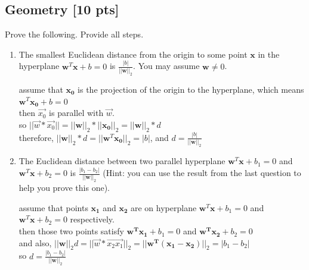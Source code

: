 \documentclass[a4paper]{article}
\theoremstyle{definition}
\newenvironment{soln}{
	\leavevmode\color{blue}\ignorespaces
}{}
\begin{document}
	
	
	\subsection{Geometry [10 pts]}
	Prove the following.  Provide all steps.
	\begin{enumerate}
		\item 	The smallest Euclidean distance from the origin to some point $\mathbf{x}$ in the hyperplane $\mathbf{w}^{T}\mathbf{x} + b = 0$ is $\frac{|b|}{||\mathbf{w}||_2}$.  You may assume $\mathbf{w} \neq 0$.\\
		\begin{soln} 
			assume that $\mathbf{x_{0}}$ is the projection of the origin to the hyperplane, which means $\mathbf{w}^{T}\mathbf{x_{0}} + b = 0$ \\
			then $\vec{x_{0}}$ is parallel with $\vec{w}$. \\
			so $||\vec{w}*\vec{x_{0}}|| = ||\mathbf{w}||_{2}*||\mathbf{x_{0}}||_{2} = ||\mathbf{w}||_{2}*d$ \\
			therefore, $||\mathbf{w}||_{2}*d = ||\mathbf{w}^{T}\mathbf{x_{0}}||_{2} = |b|$, and $d = \frac{|b|}{||\mathbf{w}||_2}$
		\end{soln}
		
		\item 	The Euclidean distance between two parallel hyperplane $\mathbf{w}^{T}\mathbf{x} + b_1 = 0$ and $\mathbf{w}^{T}\mathbf{x} + b_2 = 0$ is $\frac{|b_1 - b_2|}{||\mathbf{w}||_2}$ (Hint: you can use the result from the last question to help you prove this one).
		
		\begin{soln}
			assume that points $\mathbf{x_{1}}$ and $\mathbf{x_{2}}$ are on hyperplane $\mathbf{w}^{T}\mathbf{x} + b_1 = 0$ and $\mathbf{w}^{T}\mathbf{x} + b_2 = 0$ respectively. \\
			then those two points satisfy $\mathbf{w^{T}}\mathbf{x_{1}} + b_1 = 0$ and $\mathbf{w^{T}}\mathbf{x_{2}} + b_2 = 0$ \\
			and also, $||\mathbf{w}||_2d = ||\vec{w}*\vec{x_2x_1}||_2 = ||\mathbf{w^{T}}(\mathbf{x_1}-\mathbf{x_2})||_2 = |b_1 - b_2|$ \\
			so $d = \frac{|b_1 - b_2|}{||\mathbf{w}||_2}$ 
		\end{soln}
		
	\end{enumerate}
	
	
	
\end{document}
